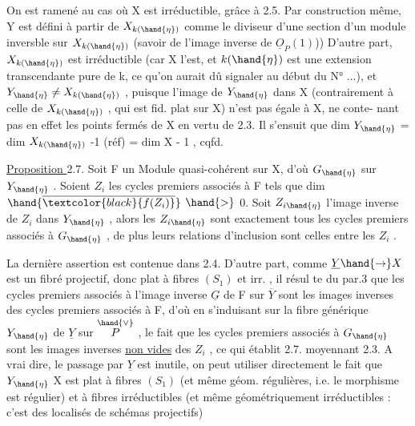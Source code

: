 
On est ramené au cas où X est irréductible, grâce à 2.5. Par construction
même, Y est défini à partir de $X_{k(\hand{\eta})}$ comme le diviseur d'une section
d'un module inversble sur $X_{k(\hand{\eta})}$ (savoir de l'image inverse de $\underline{O}_P(1)$))
D'autre part, $X_{k(\hand{\eta})}$ est irréductible (car X l'est, et $k(\hand{\eta})$ est une
\placedmargin{|} extension transcendante pure de k, ce qu'on aurait dû signaler au début du
N° ...), et $Y_{\hand{\eta}} \neq X_{k(\hand{\eta})}$ , puisque l'image de $Y_{\hand{\eta}}$ dans X (contrairement
à celle de $X_{k(\hand{\eta})}$ , qui est fid. plat sur X) n'est pas égale à X, ne conte-%
nant pas en effet les points fermés de X en vertu de 2.3. Il s'ensuit que
dim $Y_{\hand{\eta}}$ = dim $X_{k(\hand{\eta})}$ -1 (réf) = dim X - 1 , cqfd.

\uline{Proposition }2.7. Soit F un Module quasi-cohérent sur X, d'où $G_{\hand{\eta}}$ sur $Y_{\hand{\eta}}$ .
Soient $Z_i$ les cycles premiers associés à F tels que dim $\hand{\overline{\textcolor{black}{f(Z_i)}}}$ $\hand{>}$ 0. Soit
$Z_{i\hand{\eta}}$ l'image inverse de $Z_i$ dans $Y_{\hand{\eta}}$ , alors les $Z_{i\hand{\eta}}$ sont exactement tous
les cycles premiers associés à $G_{\hand{\eta}}$ , de plus leurs relations d'inclusion
sont celles entre les $Z_i$ .

La dernière assertion est contenue dans 2.4. D'autre part, comme
$\underline{Y} \hand{\rightarrow} X$ est un fibré projectif, donc plat à fibres $(S_1)$ et irr. , il résul
te du par.3 que les cycles premiers associés à l'image inverse $\underline{G}$ de F sur
$\overline{Y}$ sont les images inverses  des cycles premiers associés à F,
d'où en  s'induisant sur la fibre générique $Y_{\hand{\eta}}$ de $\underline{Y}$ sur $\overset{\hand{\vee}}{P}$ , le fait que les
cycles premiers associés à $G_{\hand{\eta}}$ sont les images inverses \uline{non vides} des $Z_i$ ,
ce qui établit 2.7. moyennant 2.3. A vrai dire, le passage par $\underline{Y}$ est
inutile, on peut utiliser directement le fait que $Y_{\hand{\eta}}$ \hand{$\longrightarrow$} X est plat à
fibres $(S_1)$ (et même géom. régulières, i.e. le morphisme est régulier)
et à fibres irréductibles (et même géométriquement irréductibles : c'est
des localisés de schémas projectifs)\hand{;} 

